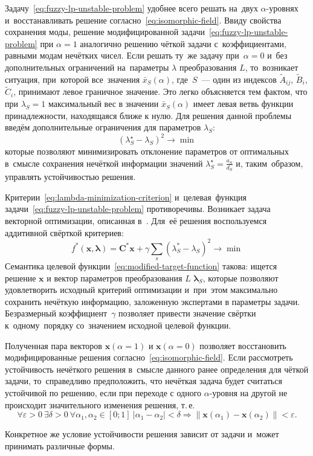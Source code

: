 Задачу~\eqref{eq:fuzzy-lp-unstable-problem} удобнее всего решать на~двух $\alpha$-уровнях и~восстанавливать решение согласно~\eqref{eq:isomorphic-field}. Ввиду свойства сохранения моды, решение модифицированной задачи~\eqref{eq:fuzzy-lp-unstable-problem} при $\alpha=1$ аналогично решению чёткой задачи с~коэффициентами, равными модам нечётких чисел. Если решать ту~же задачу при~$\alpha=0$ и~без дополнительных ограничений на~параметры $\lambda$ преобразования $L$, то~возникает ситуация, при~которой все~значения $\bar{x}_S\left(\alpha \right)$, где~$S$~--- один из индексов $\tilde A_{ij}$, $\tilde B_i$, $\tilde C_i$, принимают левое граничное значение. Это легко объясняется тем фактом, что при $\lambda_S=1$ максимальный вес в значении $\bar{x}_S\left(\alpha \right)$ имеет левая ветвь функции принадлежности, находящаяся ближе к нулю. Для решения данной проблемы введём дополнительные ограничения для параметров $\lambda_S$:
\begin{equation}
\label{eq:lambda-minimization-criterion}
  {\left( \lambda_{S}^{\star}-\lambda_S \right)}^2\to \min
\end{equation}
которые позволяют минимизировать отклонение параметров от оптимальных в~смысле сохранения нечёткой информации значений $\displaystyle \lambda_{S}^{\star}=\frac{a_S}{d_S}$ и, таким~образом, управлять устойчивостью решения. 

Критерии~\eqref{eq:lambda-minimization-criterion} и~целевая~функция задачи~\eqref{eq:fuzzy-lp-unstable-problem} противоречивы. Возникает задача векторной оптимизации, описанная в~\cite{MSU_Optimization}. Для~её решения воспользуемся аддитивной свёрткой критериев:
\begin{equation}
\label{eq:modified-target-function}
  f^{*}\left( \mathbf{x}, \mathbf{\lambda} \right)=\mathbf{C}^{*}\mathbf{x}+\gamma \sum\limits_{s}^{}{\left(\lambda_{S}^{*}-\lambda_S \right)}^{2} \to \min
\end{equation}
Семантика целевой функции~\eqref{eq:modified-target-function} такова: ищется решение $\mathbf{x}$ и вектор параметров преобразования $L$ $\mathbf{\lambda}_S$, которые позволяют удовлетворить исходный критерий оптимизации и~при~этом максимально сохранить нечёткую информацию, заложенную экспертами в параметры задачи. Безразмерный коэффициент~$\gamma$ позволяет привести значение свёртки к~одному~порядку со~значением исходной целевой функции.

Полученная пара векторов $\mathbf{x}\left( \alpha =1 \right)$ и $\mathbf{x}\left( \alpha =0 \right)$ позволяет восстановить модифицированные решения согласно~\eqref{eq:isomorphic-field}. Если рассмотреть устойчивость нечёткого решения в~смысле данного ранее определения для чёткой задачи, то~справедливо предположить, что нечёткая задача будет считаться устойчивой по решению, если при переходе с одного $\alpha$-уровня на другой не происходит значительного изменения решения, т.\,е.
\begin{equation}
\label{eq:fuzzy-solution-stability}
  \forall \varepsilon >0\ \exists \delta >0\ \forall \alpha_1, \alpha_2 \in \left[0; 1\right]\ \left| \alpha_1-\alpha_2 \right|<\delta \Rightarrow \left\| \mathbf{x}\left( \alpha_1 \right)-\mathbf{x}\left( \alpha_2  \right) \right\|<\varepsilon.
\end{equation}

Конкретное же условие устойчивости решения зависит от задачи и~может принимать различные формы.